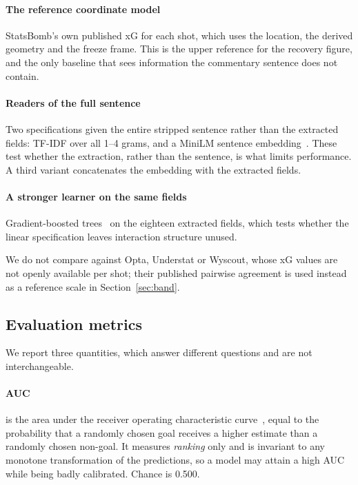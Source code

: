 \documentclass[conference]{IEEEtran}
\newcommand{\num}[1]{\mbox{#1}}
\begin{document}
\paragraph{The reference coordinate model} StatsBomb's own published xG for
each shot, which uses the location, the derived geometry and the freeze frame.
This is the upper reference for the recovery figure, and the only baseline that
sees information the commentary sentence does not contain.

\paragraph{Readers of the full sentence} Two specifications given the entire
stripped sentence rather than the extracted fields: TF-IDF over all 1--4 grams,
and a MiniLM sentence embedding~\cite{reimers2019sbert}. These test whether the
extraction, rather than the sentence, is what limits performance. A third
variant concatenates the embedding with the extracted fields.

\paragraph{A stronger learner on the same fields} Gradient-boosted
trees~\cite{chen2016xgboost} on the eighteen extracted fields, which tests
whether the linear specification leaves interaction structure unused.

We do not compare against Opta, Understat or Wyscout, whose xG values are not
openly available per shot; their published pairwise agreement is used instead
as a reference scale in Section~\ref{sec:band}.

\subsection{Evaluation metrics}
\label{sec:metrics}

We report three quantities, which answer different questions and are not
interchangeable.

\paragraph{AUC} is the area under the receiver operating characteristic
curve~\cite{hanley1982auc}, equal to the probability that a randomly chosen
goal receives a higher estimate than a randomly chosen non-goal. It measures
\emph{ranking} only and is invariant to any monotone transformation of the
predictions, so a model may attain a high AUC while being badly calibrated.
Chance is \num{0.500}.
\end{document}

